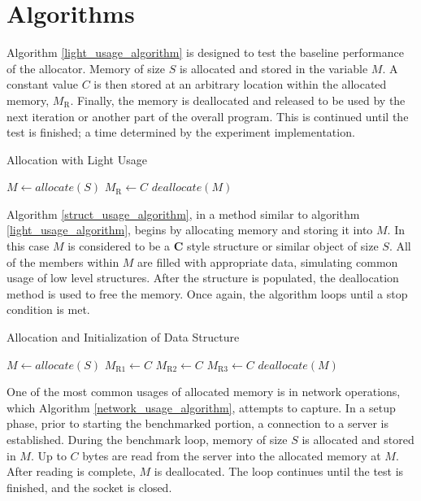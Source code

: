 \documentclass[letterpaper, 10 pt, conference]{ieeeconf}  %
\begin{document}
\section{Algorithms}

Algorithm \ref{light_usage_algorithm} is designed to test the baseline performance of the allocator.
Memory of size $S$ is allocated and stored in the variable $M$.
A constant value $C$ is then stored at an arbitrary location within the allocated memory, $M_\text{R}$.
Finally, the memory is deallocated and released to be used by the next iteration or another part of the overall program.
This is continued until the test is finished; a time determined by the experiment implementation.

\begin{algorithm}[h]
\caption{Allocation with Light Usage}
\begin{algorithmic}

  \STATE $M \leftarrow allocate(S)$
  \STATE $M_\text{R} \leftarrow C$
  \STATE $deallocate(M)$
\ENDWHILE
\end{algorithmic}
\label{light_usage_algorithm}
\end{algorithm}

Algorithm \ref{struct_usage_algorithm}, in a method similar to algorithm \ref{light_usage_algorithm}, begins by allocating memory and storing it into $M$.
In this case $M$ is considered to be a \textbf{C} style structure or similar object of size $S$. 
All of the members within $M$ are filled with appropriate data, simulating common usage of low level structures.
After the structure is populated, the deallocation method is used to free the memory.
Once again, the algorithm loops until a stop condition is met.

\begin{algorithm}[h]
  \caption{Allocation and Initialization of Data Structure}
  \begin{algorithmic}
      \STATE $M \leftarrow allocate(S)$
      \STATE $M_\text{R1} \leftarrow C$
      \STATE $M_\text{R2} \leftarrow C$
      \STATE $M_\text{R3} \leftarrow C$
      \STATE $deallocate(M)$
    \ENDWHILE
  \end{algorithmic}
\label{struct_usage_algorithm}
\end{algorithm}

One of the most common usages of allocated memory is in network operations, which Algorithm \ref{network_usage_algorithm}, attempts to capture.
In a setup phase, prior to starting the benchmarked portion, a connection to a server is established.
During the benchmark loop, memory of size $S$ is allocated and stored in $M$.
Up to $C$ bytes are read from the server into the allocated memory at $M$.
After reading is complete, $M$ is deallocated.
The loop continues until the test is finished, and the socket is closed.
\end{document}
